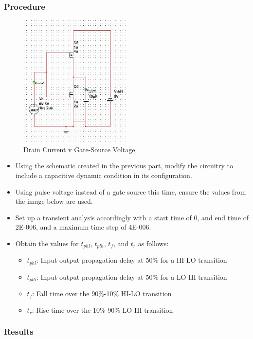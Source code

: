 \documentclass[12pt]{article}
\begin{document}
\subsubsection{Procedure}
\begin{figure}[h]
\centering
\includegraphics[width=0.5\textwidth]{6.jpg}
\caption{Drain Current v Gate-Source Voltage}
\end{figure}
\begin{itemize}
\item Using the schematic created in the previous part, modify the circuitry to include a capacitive dynamic condition in its configuration.
\item Using pulse voltage instead of a gate source this time, ensure the values from the image below are used.
\item Set up a transient analysis accordingly with a start time of 0, and end time of 2E-006, and a maximum time step of 4E-006.
\item Obtain the values for $t_{phl}$, $t_{plh}$, $t_f$, and $t_r$ as follows:
\begin{itemize}
\item $t_{phl}$: Input-output propagation delay at 50\% for a HI-LO transition
\item $t_{plh}$: Input-output propagation delay at 50\% for a LO-HI transition
\item $t_f$: Fall time over the 90\%-10\% HI-LO transition
\item $t_r$: Rise time over the 10\%-90\% LO-HI transition
\end{itemize}
\end{itemize}
\subsubsection{Results}
\end{document}
